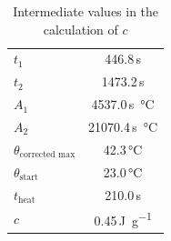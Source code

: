 \documentclass[a4paper,11pt]{article}
\begin{document}
\begin{table}[h]
\begin{center}
\begin{tabular}{lS[table-format=1.7,table-align-text-post = false]}
$t_1$ & 446.8\,\si{s} \\
$t_2$ & 1473.2\,\si{s} \\
$A_1$ & 4537.0\,\si{\second\celsius} \\
$A_2$ & 21070.4\,\si{\second\celsius} \\
$\theta_{\text{corrected max}}$ & 42.3\,\si{\celsius} \\
$\theta_{\text{start}}$ & 23.0\,\si{\celsius} \\
$t_{\text{heat}}$ & 210.0\,\si{s} \\
$c$ & 0.45\,\si{\joule \per \gram} \\
\end{tabular}
\end{center}
\caption{Intermediate values in the calculation of $c$}\label{tab:values}
\end{table}

\nocite{*}


\end{document}
